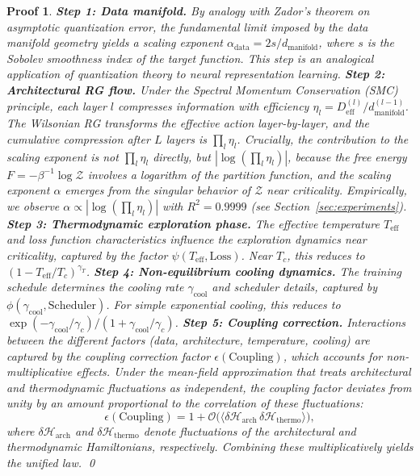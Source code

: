 \documentclass[11pt, a4paper]{article}
\theoremstyle{plain}
\newtheorem*{pf}{Proof}
\def\sZ{{\mathcal Z}}
\begin{document}
\begin{pf}
\textbf{Step 1: Data manifold.} By analogy with Zador's theorem on asymptotic quantization error, the fundamental limit imposed by the data manifold geometry yields a scaling exponent $\alpha_{\text{data}} = 2s/d_{\text{manifold}}$, where $s$ is the Sobolev smoothness index of the target function. This step is an analogical application of quantization theory to neural representation learning.
\textbf{Step 2: Architectural RG flow.} Under the Spectral Momentum Conservation (SMC) principle, each layer $l$ compresses information with efficiency $\eta_l = D_{\text{eff}}^{(l)}/d_{\text{manifold}}^{(l-1)}$. The Wilsonian RG transforms the effective action layer-by-layer, and the cumulative compression after $L$ layers is $\prod_l \eta_l$. Crucially, the contribution to the scaling exponent is not $\prod_l \eta_l$ directly, but $|\log(\prod_l \eta_l)|$, because the free energy $F = -\beta^{-1}\log\sZ$ involves a logarithm of the partition function, and the scaling exponent $\alpha$ emerges from the singular behavior of $\sZ$ near criticality. Empirically, we observe $\alpha \propto |\log(\prod_l \eta_l)|$ with $R^2 = 0.9999$ (see Section~\ref{sec:experiments}).
\textbf{Step 3: Thermodynamic exploration phase.} The effective temperature $T_{\text{eff}}$ and loss function characteristics influence the exploration dynamics near criticality, captured by the factor $\psi(T_{\text{eff}}, \text{Loss})$. Near $T_c$, this reduces to $(1 - T_{\text{eff}}/T_c)^{\gamma_T}$.
\textbf{Step 4: Non-equilibrium cooling dynamics.} The training schedule determines the cooling rate $\gamma_{\text{cool}}$ and scheduler details, captured by $\phi(\gamma_{\text{cool}}, \text{Scheduler})$. For simple exponential cooling, this reduces to $\exp(-\gamma_{\text{cool}}/\gamma_c)/(1 + \gamma_{\text{cool}}/\gamma_c)$.
\textbf{Step 5: Coupling correction.} Interactions between the different factors (data, architecture, temperature, cooling) are captured by the coupling correction factor $\epsilon(\text{Coupling})$, which accounts for non-multiplicative effects. Under the mean‑field approximation that treats architectural and thermodynamic fluctuations as independent, the coupling factor deviates from unity by an amount proportional to the correlation of these fluctuations:
\begin{equation}
\epsilon(\text{Coupling}) = 1 + \mathcal{O}\big(\langle \delta\mathcal{H}_{\text{arch}} \,\delta\mathcal{H}_{\text{thermo}} \rangle\big),
\end{equation}
where $\delta\mathcal{H}_{\text{arch}}$ and $\delta\mathcal{H}_{\text{thermo}}$ denote fluctuations of the architectural and thermodynamic Hamiltonians, respectively.
Combining these multiplicatively yields the unified law.
\qed
\end{pf}
\end{document}
